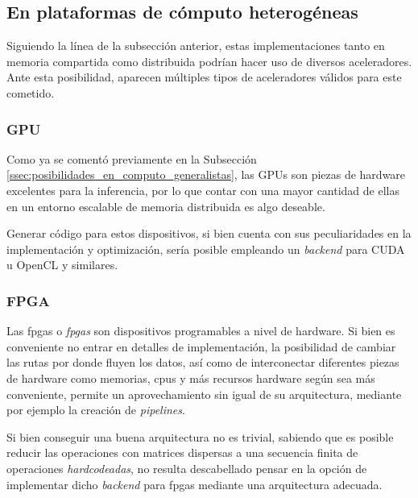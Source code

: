 \subsection{En plataformas de cómputo heterogéneas}
\label{ssec:posibilidades_en_computo_heterogeneas}
Siguiendo la línea de la subsección anterior, estas implementaciones tanto en memoria compartida como distribuida podrían hacer uso de diversos aceleradores. Ante esta posibilidad, aparecen múltiples tipos de aceleradores válidos para este cometido.

\subsubsection{GPU}
\label{sssec:heterogeneas_gpu}
Como ya se comentó previamente en la Subsección \ref{ssec:posibilidades_en_computo_generalistas}, las GPUs son piezas de hardware excelentes para la inferencia, por lo que contar con una mayor cantidad de ellas en un entorno escalable de memoria distribuida es algo deseable.

Generar código para estos dispositivos, si bien cuenta con sus peculiaridades en la implementación y optimización, sería posible empleando un \textit{\gls{backend}} para CUDA u OpenCL y similares.

\subsubsection{FPGA}
\label{sssec:heterogeneas_fpga}
Las \acrshort{fpga}s o \textit{\acrlong{fpga}s} son dispositivos programables a nivel de hardware. Si bien es conveniente no entrar en detalles de implementación, la posibilidad de cambiar las rutas por donde fluyen los datos, así como de interconectar diferentes piezas de hardware como memorias, \acrshort{cpu}s y más recursos hardware según sea más conveniente, permite un aprovechamiento sin igual de su arquitectura, mediante por ejemplo la creación de \textit{pipelines}.

Si bien conseguir una buena arquitectura no es trivial, sabiendo que es posible reducir las operaciones con matrices dispersas a una secuencia finita de operaciones \textit{hardcodeadas}, no resulta descabellado pensar en la opción de implementar dicho \textit{\gls{backend}} para \acrshort{fpga}s mediante una arquitectura adecuada.

